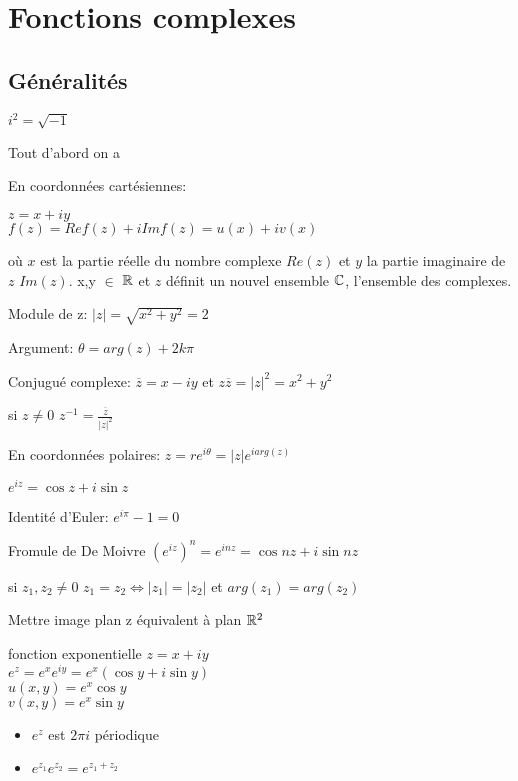\chapter[Fonctions complexes]{Fonctions complexes}

\section{Généralités}
$i^2=\sqrt{-1}$

Tout d'abord on a 


En coordonnées cartésiennes:
\begin{myDefinition}
$z = x + iy $
\\
$f(z)=Re f(z) + iIm f(z) = u(x) + iv(x)$
\end{myDefinition}


où $x$ est la partie réelle du nombre complexe $Re(z)$ et $y$ la partie imaginaire de $z$ $Im(z)$. 
x,y  $\in $ $\mathbb{R}$ et $z$ définit un nouvel ensemble $\mathbb{C}$, l'ensemble des complexes.

Module de z:
$|z| = \sqrt{x^2+y^2} = 2$

Argument:
$\theta = arg(z) + 2k\pi$

Conjugué complexe:
$\overline{z}=x-iy$ 
et
$z\overline{z}=|z|^2=x^2 + y^2$

si $z \neq 0$
$z^{-1} = \frac{\overline{z}}{{\left| z \right|}^2}$

En coordonnées polaires:
$z = re^{i\theta} = |z|e^{iarg(z)}$

$e^{iz}=\cos{z} + i\sin{z}$

Identité d'Euler:
$e^{i\pi} -1 = 0 $

\begin{myTheorem}
Fromule de De Moivre
$\left( e^{iz} \right)^n =e^{inz}=\cos{nz} + i\sin{nz}$
\end{myTheorem}

si $z_{1},z_{2} \neq 0$
$z_{1}=z_{2} \Leftrightarrow |z_{1}|=|z_{2}|$ et $arg(z_{1})=arg(z_{2})$

Mettre image plan z équivalent à plan $\mathbb{R}^2$

\begin{myExample}
	fonction exponentielle
	$z = x + iy$
	\\
	$e^z=e^xe^{iy} = e^x(\cos{y} + i\sin{y})$
	\\
	$u(x,y)=e^x\cos{y}$
	\\
	$v(x,y)=e^x\sin{y}$
	\begin{itemize}
		\item $e^z$ est $2\pi i$ périodique
		\item $e^{z_{1}}e^{z_{2}}=e^{z_{1}+z_{2}}$
	\end{itemize}
\end{myExample}



